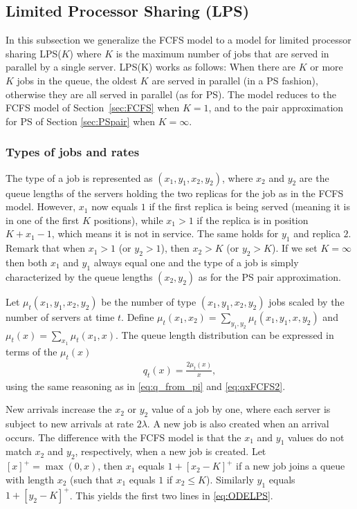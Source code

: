 \documentclass[acmsmall,nonacm]{acmart}
\newcommand\red[1]{{#1}}
\begin{document}
\subsection{Limited Processor Sharing (LPS)}

In this subsection we generalize the FCFS model to a model for limited processor sharing LPS($K$) where $K$ is the
maximum number of jobs that are served in parallel by a single server. \red{LPS(K) works as follows: When there are $K$ or more
$K$ jobs in the queue, the oldest $K$ are served in parallel (in a PS fashion), otherwise they are all served in parallel (as for PS).} The model reduces to the FCFS model of Section~\ref{sec:FCFS} when $K=1$, and to the pair approximation for PS of Section \ref{sec:PSpair} when $K=\infty$.


\subsubsection{Types of jobs and rates}


The type of a job is represented as $(x_1,y_1,x_2,y_2)$, where $x_2$ and $y_2$ are the queue lengths
of the servers holding the two replicas for the job as in the FCFS model. However, $x_1$ now equals
$1$ if the first replica is being served (meaning it is in one of the first $K$ positions),
while $x_1 > 1$ if the replica is in position $K+x_1-1$, which means it is not in service.
The same holds for $y_1$ and replica $2$. Remark that when $x_1 > 1$ (or $y_2 > 1$), 
then $x_2 > K$ (or $y_2>K$).
If we set $K=\infty$ then both $x_1$ and $y_1$
always equal one and the type of a job is simply characterized by the queue lengths $(x_2,y_2)$ as for the PS pair approximation. 

Let $\mu_t(x_1,y_1,x_2,y_2)$ be the number of type $(x_1,y_1,x_2,y_2)$ jobs scaled by the number of
servers at time $t$. Define $\mu_t(x_1,x_2) = \sum_{y_1,y_2} \mu_t(x_1,y_1,x,y_2)$
and $\mu_t(x)=\sum_{x_1} \mu_t(x_1,x)$.
The queue length distribution can be expressed in terms of the $\mu_t(x)$ 
\begin{align}\label{eq:qxLPS}
    q_t(x) = \frac{2 \mu_t(x)}{x},
\end{align} 
using the same reasoning as in \eqref{eq:q_from_pi} and \eqref{eq:qxFCFS2}.

New arrivals increase the $x_2$ or $y_2$ value of a job by one, where each server is subject to new arrivals at rate
$2\lambda$. A new job is also created when an arrival occurs. The difference with the
FCFS model is that the $x_1$ and $y_1$ values do not match $x_2$ and $y_2$, respectively,
when a new job is created. Let $[x]^+ = \max(0,x)$, then $x_1$ equals $1+[x_2-K]^+$
if a new job joins a queue with length $x_2$ (such that $x_1$ equals $1$ if $x_2 \leq K$). Similarly $y_1$ equals $1+[y_2-K]^+$. This yields the first two lines in \eqref{eq:ODELPS}.
\end{document}
